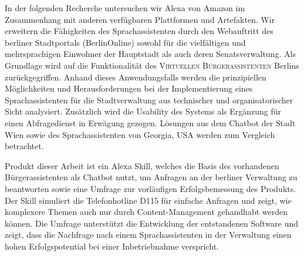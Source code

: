 In der folgenden Recherche untersuchen wir Alexa von Amazon im Zusammenhang mit anderen verfügbaren Plattformen und Artefakten. Wir erweitern die Fähigkeiten des Sprachassistenten durch den Webauftritt des berliner Stadtportals (BerlinOnline) %
sowohl für die vielfältigen und mehrsprachigen Einwohner der Hauptstadt als auch deren Senatsverwaltung. Als Grundlage wird auf die Funktionalität des  %
	\textsc{Virtuellen Bürgerassistenten} Berlins
zurückgegriffen. Anhand dieses Anwendungsfalls werden die prinzipiellen Möglichkeiten und Herausforderungen bei der Implementierung eines Sprachassistenten für die Stadtverwaltung aus technischer und organisatorischer Sicht analysiert. Zusätzlich wird die Usability des Systems als Ergänzung für einen Abfragedienst in Erwägung gezogen. %
Lösungen aus dem Chatbot der Stadt Wien sowie des Sprachassistenten von Georgia, USA werden zum Vergleich betrachtet.


Produkt dieser Arbeit ist ein Alexa Skill, welches die Basis des vorhandenen Bürgerassistenten als Chatbot nutzt, um Anfragen an der berliner Verwaltung zu beantworten sowie eine Umfrage zur vorläufigen Erfolgsbemessung des Produkts. Der Skill simuliert die Telefonhotline D115 für einfache Anfragen und zeigt, wie komplexere Themen auch nur durch Content-Management gehandhabt werden können. Die Umfrage unterstützt die Entwicklung der entstandenen Software und zeigt, dass die Nachfrage nach einem Sprachassistenten in der Verwaltung einen hohen Erfolgspotential bei einer Inbetriebnahme verspricht. 









